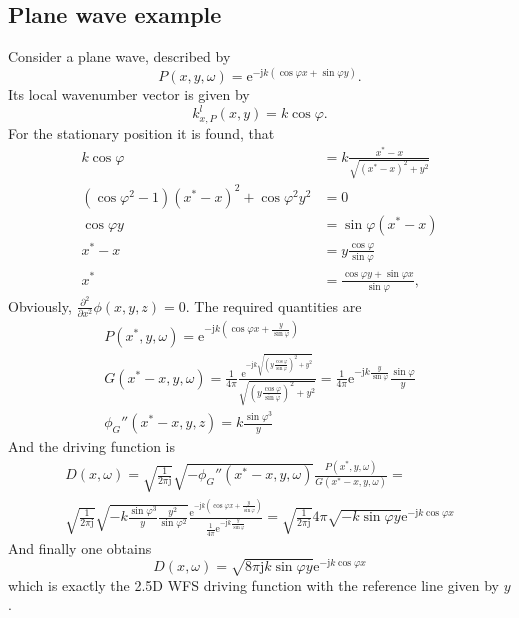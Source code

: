 \documentclass[12pt,a4paper]{article}
\newcommand{\te}{\mathrm{e}}
\newcommand{\ti}{\mathrm{j}}
\newcommand{\sinfi}{\sin\varphi}
\newcommand{\cosfi}{\cos\varphi}
\begin{document}
\subsection{Plane wave example}
Consider a plane wave, described by
\begin{equation}
P(x,y,\omega) = \te^{-\ti k\left( \cosfi x + \sinfi y\right) }.
\end{equation}
Its local wavenumber vector is given by
\begin{equation}
k_{x,P}^l(x,y)= k\cosfi.
\end{equation}
For the stationary position it is found, that
\begin{align}
k \cosfi &=  k \frac{x^*-x}{\sqrt{(x^*-x)^2+y^2}} \\
(\cosfi^2 - 1)(x^*-x)^2+ \cosfi^2 y^2 &= 0 \\
\cosfi y &= \sinfi(x^*-x)\\
x^*-x &= y\frac{\cosfi}{\sinfi} \\
x^* &= \frac{\cosfi y + \sinfi x}{\sinfi},
\end{align}
Obviously, $\frac{\partial^2}{\partial x^2} \phi(x,y,z)  = 0$.
The required quantities are
\begin{eqnarray}
P(x^*,y,\omega) = \te^{-\ti k\left( \cosfi x + \frac{y} {\sinfi} \right) }\\
G(x^* - x,y,\omega) = \frac{1}{4\pi}\frac{\te^{-\ti k \sqrt{\left( y\frac{\cosfi}{\sinfi} \right)^2+y^2}}}{\sqrt{\left( y\frac{\cosfi}{\sinfi} \right)^2 + y^2}} =
\frac{1}{4\pi}\te^{-\ti k \frac{y}{\sinfi}}{\frac{\sinfi}{y}}
\\
\phi_G''(x^*-x,y,z) = k\frac{\sinfi^3}{y} 
\end{eqnarray}
And the driving function is
\begin{multline}
D(x,\omega) = 
\sqrt{\frac{1}{2\pi \ti}}
\sqrt{-\phi_G''(x^*- x,y,\omega)}
\frac{ P(x^*,y,\omega) }{G(x^*- x,y,\omega) } = \\
\sqrt{\frac{1}{2\pi \ti}}
\sqrt{-k\frac{\sinfi^3}{y} \frac{y^2}{\sinfi^2}}
\frac{ \te^{-\ti k\left( \cosfi x + \frac{y} {\sinfi} \right) } }{  \frac{1}{4\pi}\te^{-\ti k \frac{y}{\sinfi}} } =
\sqrt{\frac{1}{2\pi \ti}}
4\pi\sqrt{-k\sinfi y}
\te^{-\ti k\cosfi x } 
\end{multline}
And finally one obtains
\begin{equation}
D(x,\omega) =
\sqrt{8\pi \ti k\sinfi y }
\te^{-\ti k\cosfi x } 
\end{equation}
which is exactly the 2.5D WFS driving function with the reference line given by $y$.
\end{document}
